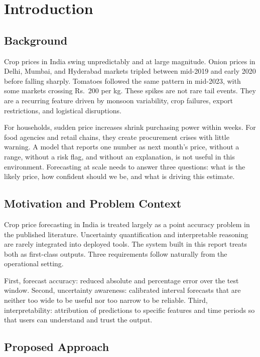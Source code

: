 \documentclass[12pt,a4paper]{report}
\begin{document}
\chapter{Introduction}

\section{Background}

Crop prices in India swing unpredictably and at large magnitude. Onion prices in Delhi,
Mumbai, and Hyderabad markets tripled between mid-2019 and early 2020 before falling
sharply. Tomatoes followed the same pattern in mid-2023, with some markets crossing
Rs.\ 200 per kg. These spikes are not rare tail events. They are a recurring feature driven
by monsoon variability, crop failures, export restrictions, and logistical disruptions.

For households, sudden price increases shrink purchasing power within weeks. For food
agencies and retail chains, they create procurement crises with little warning. A model that
reports one number as next month's price, without a range, without a risk flag, and without
an explanation, is not useful in this environment. Forecasting at scale needs to answer three
questions: what is the likely price, how confident should we be, and what is driving this
estimate.

\section{Motivation and Problem Context}

Crop price forecasting in India is treated largely as a point accuracy problem in the
published literature. Uncertainty quantification and interpretable reasoning are rarely
integrated into deployed tools. The system built in this report treats both as first-class
outputs. Three requirements follow naturally from the operational setting.

First, forecast accuracy: reduced absolute and percentage error over the test window.
Second, uncertainty awareness: calibrated interval forecasts that are neither too wide to be
useful nor too narrow to be reliable. Third, interpretability: attribution of predictions to
specific features and time periods so that users can understand and trust the output.

\section{Proposed Approach}
\end{document}
